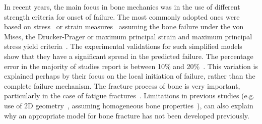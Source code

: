 \documentclass[review]{elsarticle}
\numberwithin{equation}{section}
\begin{document}
In recent years, the main focus in bone mechanics was in the use of different strength criteria for onset of failure. 
The most commonly adopted ones were based on stress~\citep{keyak2005predicting} or strain measures~\citep{schileo2008subject} assuming the bone failure under the von Mises, the Drucker-Prager or maximum principal strain and maximum principal stress yield criteria~\citep{yosibash2010predicting}. 
The experimental validations for such simplified models show that they have a significant spread in the predicted failure. 
The percentage error in the majority of studies report is between 10\% and 20\%~\citep{van2014accurately}.
This variation is explained perhaps by their focus on the local initiation of failure, rather than the complete failure mechanism. 
The fracture process of bone is very important,  particularly in the case of fatigue fractures~\citep{gupta2008fracture}. 
Limitations in previous studies (e.g. use of 2D geometry~\citep{bettamer2017using}, assuming homogeneous bone properties~\citep{gasser2007numerical}), 
can also explain why an appropriate model for bone fracture has not been developed previously.

\end{document}
